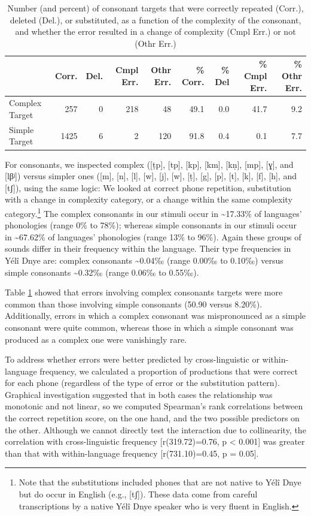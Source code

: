 \documentclass[english,,man,floatsintext]{apa6}
\begin{document}
\begin{table}

\caption{\label{tab:tab-c}Number (and percent) of consonant targets that were correctly repeated (Corr.), deleted (Del.), or substituted, as a function of the complexity of the consonant, and whether the error resulted in a change of complexity (Cmpl Err.) or not (Othr Err.)}
\centering
\begin{tabular}[t]{lrrrrrrrr}
\toprule
  & Corr. & Del. & Cmpl Err. & Othr Err. & \% Corr. & \% Del & \% Cmpl Err. & \% Othr Err.\\
\midrule
Complex Target & 257 & 0 & 218 & 48 & 49.1 & 0.0 & 41.7 & 9.2\\
Simple Target & 1425 & 6 & 2 & 120 & 91.8 & 0.4 & 0.1 & 7.7\\
\bottomrule
\end{tabular}
\end{table}

For consonants, we inspected complex ({[}ṭp{]}, {[}tp{]}, {[}kp{]}, {[}km{]}, {[}kṇ{]}, {[}mp{]}, {[}ɣ{]}, and {[}lβʲ{]}) versus simpler ones ({[}m{]}, {[}n{]}, {[}l{]}, {[}w{]}, {[}j{]}, {[}w{]}, {[}ṭ{]}, {[}g{]}, {[}p{]}, {[}t{]}, {[}k{]}, {[}f{]}, {[}h{]}, and {[}tʃ{]}), using the same logic: We looked at correct phone repetition, substitution with a change in complexity category, or a change within the same complexity category.\footnote{Note that the substitutions included phones that are not native to Yélî Dnye but do occur in English (e.g., {[}tʃ{]}). These data come from careful transcriptions by a native Yélî Dnye speaker who is very fluent in English.}
The complex consonants in our stimuli occur in \textasciitilde{}17.33\% of languages' phonologies (range 0\% to 78\%);
whereas simple consonants in our stimuli occur in \textasciitilde{}67.62\% of languages' phonologies (range 13\% to 96\%).
Again these groups of sounds differ in their frequency within the language. Their type frequencies in Yélî Dnye are: complex consonants \textasciitilde{}0.04‰ (range 0.00‰ to 0.10‰) versus simple consonants \textasciitilde{}0.32‰ (range 0.06‰ to 0.55‰).

Table \ref{tab:tab-c} showed that errors involving complex consonants targets were more common than those involving simple consonants (50.90 versus 8.20\%). Additionally, errors in which a complex consonant was mispronounced as a simple consonant were quite common, whereas those in which a simple consonant was produced as a complex one were vanishingly rare.

To address whether errors were better predicted by cross-linguistic or within-language frequency, we calculated a proportion of productions that were correct for each phone (regardless of the type of error or the substitution pattern). Graphical investigation suggested that in both cases the relationship was monotonic and not linear, so we computed Spearman's rank correlations between the correct repetition score, on the one hand, and the two possible predictors on the other. Although we cannot directly test the interaction due to collinearity, the correlation with cross-linguistic frequency {[}r(319.72)=0.76, p \textless{} 0.001{]} was greater than that with within-language frequency {[}r(731.10)=0.45, p = 0.05{]}.
\end{document}
